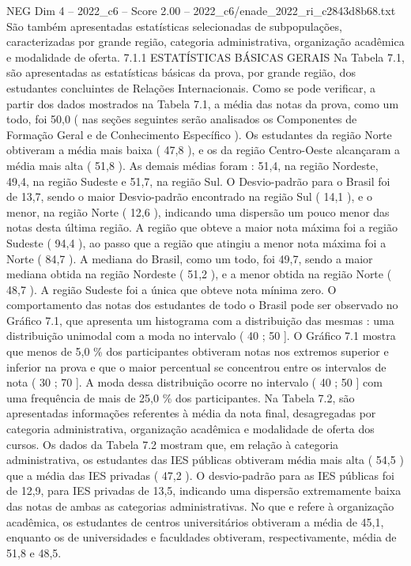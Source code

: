 \begin{textsample}{NEG Dim 4 – 2022\_c6 – Score 2.00 – 2022\_c6/enade\_2022\_ri\_c2843d8b68.txt}
São também apresentadas estatísticas selecionadas de subpopulações, caracterizadas por grande região, categoria administrativa, organização acadêmica e modalidade de oferta. 7.1.1 ESTATÍSTICAS BÁSICAS GERAIS Na Tabela 7.1, são apresentadas as estatísticas básicas da prova, por grande região, dos estudantes concluintes de Relações Internacionais.
Como se pode verificar, a partir dos dados mostrados na Tabela 7.1, a média das notas da prova, como um todo, foi 50,0 ( nas seções seguintes serão analisados os Componentes de Formação Geral e de Conhecimento Específico ).
Os estudantes da região Norte obtiveram a média mais baixa ( 47,8 ), e os da região Centro-Oeste alcançaram a média mais alta ( 51,8 ).
As demais médias foram : 51,4, na região Nordeste, 49,4, na região Sudeste e 51,7, na região Sul.
O Desvio-padrão para o Brasil foi de 13,7, sendo o maior Desvio-padrão encontrado na região Sul ( 14,1 ), e o menor, na região Norte ( 12,6 ), indicando uma dispersão um pouco menor das notas desta última região.
A região que obteve a maior nota máxima foi a região Sudeste ( 94,4 ), ao passo que a região que atingiu a menor nota máxima foi a Norte ( 84,7 ).
A mediana do Brasil, como um todo, foi 49,7, sendo a maior mediana obtida na região Nordeste ( 51,2 ), e a menor obtida na região Norte ( 48,7 ).
A região Sudeste foi a única que obteve nota mínima zero.
O comportamento das notas dos estudantes de todo o Brasil pode ser observado no Gráfico 7.1, que apresenta um histograma com a distribuição das mesmas : uma distribuição unimodal com a moda no intervalo ( 40 ; 50 ].
O Gráfico 7.1 mostra que menos de 5,0 \% dos participantes obtiveram notas nos extremos superior e inferior na prova e que o maior percentual se concentrou entre os intervalos de nota ( 30 ; 70 ].
A moda dessa distribuição ocorre no intervalo ( 40 ; 50 ] com uma frequência de mais de 25,0 \% dos participantes.
Na Tabela 7.2, são apresentadas informações referentes à média da nota final, desagregadas por categoria administrativa, organização acadêmica e modalidade de oferta dos cursos.
Os dados da Tabela 7.2 mostram que, em relação à categoria administrativa, os estudantes das IES públicas obtiveram média mais alta ( 54,5 ) que a média das IES privadas ( 47,2 ).
O desvio-padrão para as IES públicas foi de 12,9, para IES privadas de 13,5, indicando uma dispersão extremamente baixa das notas de ambas as categorias administrativas.
No que e refere à organização acadêmica, os estudantes de centros universitários obtiveram a média de 45,1, enquanto os de universidades e faculdades obtiveram, respectivamente, média de 51,8 e 48,5.

\end{textsample}
